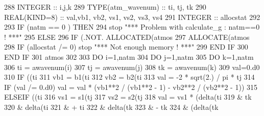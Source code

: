 \begin{DoxyCode}
288     \textcolor{keywordtype}{INTEGER} :: i,j,k
289     \textcolor{keywordtype}{TYPE}(atm\_wavenum) :: ti, tj, tk
290     \textcolor{keywordtype}{REAL(KIND=8)} :: val,vb1, vb2, vs1, vs2, vs3, vs4
291     \textcolor{keywordtype}{INTEGER} :: allocstat
292 
293     \textcolor{keywordflow}{IF} (natm == 0 ) \textcolor{keywordflow}{THEN}
294        stop \textcolor{stringliteral}{"*** Problem with calculate\_g : natm==0 ! ***"}
295     \textcolor{keywordflow}{ELSE}
296        \textcolor{keywordflow}{IF} (.NOT. \textcolor{keyword}{ALLOCATED}(atmos%
297           \textcolor{keyword}{ALLOCATE}(atmos%
298           \textcolor{keywordflow}{IF} (allocstat /= 0) stop \textcolor{stringliteral}{"*** Not enough memory ! ***"}
299 \textcolor{keywordflow}{       END IF}
300 \textcolor{keywordflow}{    END IF}
301     atmos%
302 
303     \textcolor{keywordflow}{DO} i=1,natm
304        \textcolor{keywordflow}{DO} j=1,natm
305           \textcolor{keywordflow}{DO} k=1,natm
306              ti = awavenum(i)
307              tj = awavenum(j)
308              tk = awavenum(k)
309              val=0.d0
310              \textcolor{keywordflow}{IF} ((ti%
311                 vb1 = b1(ti%
312                 vb2 = b2(ti%
313                 val = -2 * sqrt(2.) / pi * tj%
314                 \textcolor{keywordflow}{IF} (val /= 0.d0) val = val * (vb1**2 / (vb1**2 - 1) - vb2**2 / (vb2**2 - 1))
315              \textcolor{keywordflow}{ELSEIF} ((ti%
316                 vs1 = s1(tj%
317                 vs2 = s2(tj%
318                 val = vs1 * (delta(ti%
319                      & tk%
320                      & delta(ti%
321                      & + ti%
322                      & delta(tk%
323                      & - tk%
324                      & (delta(tk%

\end{DoxyCode}
